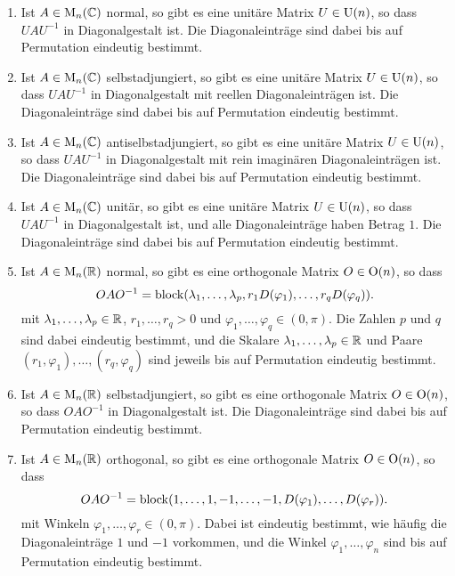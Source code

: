 \documentclass[a4paper, 10pt, numbers=noenddot]{scrartcl}
\begin{document}
\begin{theorem}\label{thrm: existence of unitary basis change matrix}
  \begin{enumerate}[leftmargin=*]
    \item
      Ist $A \in \operatorname{M}_n(\mathbb{C})$ normal, so gibt es eine unitäre Matrix $U \in \operatorname{U}(n)$, so dass $U \! A U^{-1}$ in Diagonalgestalt ist.
      Die Diagonaleinträge sind dabei bis auf Permutation eindeutig bestimmt.
    \item
      Ist $A \in \operatorname{M}_n(\mathbb{C})$ selbstadjungiert, so gibt es eine unitäre Matrix $U \in \operatorname{U}(n)$, so dass $U \! A U^{-1}$ in Diagonalgestalt mit reellen Diagonaleinträgen ist.
      Die Diagonaleinträge sind dabei bis auf Permutation eindeutig bestimmt.
    \item
      Ist $A \in \operatorname{M}_n(\mathbb{C})$ antiselbstadjungiert, so gibt es eine unitäre Matrix $U \in \operatorname{U}(n)$, so dass $U \! A U^{-1}$ in Diagonalgestalt mit rein imaginären Diagonaleinträgen ist.
      Die Diagonaleinträge sind dabei bis auf Permutation eindeutig bestimmt.
    \item
      Ist $A \in \operatorname{M}_n(\mathbb{C})$ unitär, so gibt es eine unitäre Matrix $U \in \operatorname{U}(n)$, so dass $U \! A U^{-1}$ in Diagonalgestalt ist, und alle Diagonaleinträge haben Betrag $1$.
      Die Diagonaleinträge sind dabei bis auf Permutation eindeutig bestimmt.
    \item
      Ist $A \in \operatorname{M}_n(\mathbb{R})$ normal, so gibt es eine orthogonale Matrix $O \in \operatorname{O}(n)$, so dass
      \[
          O A O^{-1}
        = \operatorname{\operatorname{block}}(\lambda_1, \dotsc, \lambda_p, r_1 D(\varphi_1), \dotsc, r_q D(\varphi_q)).
      \]
      mit $\lambda_1, \dotsc, \lambda_p \in \mathbb{R}$, $r_1, \dotsc, r_q > 0$ und $\varphi_1, \dotsc, \varphi_q \in (0,\pi)$.
      Die Zahlen $p$ und $q$ sind dabei eindeutig bestimmt, und die Skalare $\lambda_1, \dotsc, \lambda_p \in \mathbb{R}$ und Paare $(r_1, \varphi_1), \dotsc, (r_q, \varphi_q)$ sind jeweils bis auf Permutation eindeutig bestimmt.
    \item
      Ist $A \in \operatorname{M}_n(\mathbb{R})$ selbstadjungiert, so gibt es eine orthogonale Matrix $O \in \operatorname{O}(n)$, so dass $O A O^{-1}$ in Diagonalgestalt ist.
      Die Diagonaleinträge sind dabei bis auf Permutation eindeutig bestimmt.
    \item
      Ist $A \in \operatorname{M}_n(\mathbb{R})$ orthogonal, so gibt es eine orthogonale Matrix $O \in \operatorname{O}(n)$, so dass
      \[
          O A O^{-1}
        = \operatorname{\operatorname{block}}(1, \dotsc, 1, -1, \dotsc, -1, D(\varphi_1), \dotsc, D(\varphi_r)).
      \]
      mit Winkeln $\varphi_1, \dotsc, \varphi_r \in (0,\pi)$.
      Dabei ist eindeutig bestimmt, wie häufig die Diagonaleinträge $1$ und $-1$ vorkommen, und die Winkel $\varphi_1, \dotsc, \varphi_n$ sind bis auf Permutation eindeutig bestimmt.
  \end{enumerate}
\end{theorem}
\end{document}

